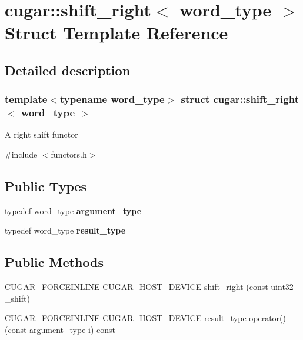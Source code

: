 \hypertarget{structcugar_1_1shift__right}{}\section{cugar\+:\+:shift\+\_\+right$<$ word\+\_\+type $>$ Struct Template Reference}
\label{structcugar_1_1shift__right}


\subsection{Detailed description}
\subsubsection*{template$<$typename word\+\_\+type$>$\newline
struct cugar\+::shift\+\_\+right$<$ word\+\_\+type $>$}

A right shift functor 

{\ttfamily \#include $<$functors.\+h$>$}

\subsection*{Public Types}
\begin{DoxyCompactItemize}
\item 
\mbox{\label{structcugar_1_1shift__right_abba97743c24623c0b08a41f3dbd90b88}} 
typedef word\+\_\+type {\bfseries argument\+\_\+type}
\item 
\mbox{\label{structcugar_1_1shift__right_a2875dc32075db222fbfff0c9c4892b11}} 
typedef word\+\_\+type {\bfseries result\+\_\+type}
\end{DoxyCompactItemize}
\subsection*{Public Methods}
\begin{DoxyCompactItemize}
\item 
C\+U\+G\+A\+R\+\_\+\+F\+O\+R\+C\+E\+I\+N\+L\+I\+NE C\+U\+G\+A\+R\+\_\+\+H\+O\+S\+T\+\_\+\+D\+E\+V\+I\+CE \hyperlink{structcugar_1_1shift__right_a803343d3bc4cac61aba433baec3276d5}{shift\+\_\+right} (const uint32 \+\_\+shift)
\item 
C\+U\+G\+A\+R\+\_\+\+F\+O\+R\+C\+E\+I\+N\+L\+I\+NE C\+U\+G\+A\+R\+\_\+\+H\+O\+S\+T\+\_\+\+D\+E\+V\+I\+CE result\+\_\+type \hyperlink{structcugar_1_1shift__right_a2c88a2717a9bd1ece9fd595835beaed7}{operator()} (const argument\+\_\+type i) const
\end{DoxyCompactItemize}
